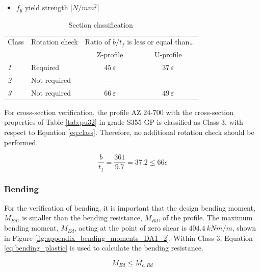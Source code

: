 \begin{itemize}
    \item $f_{y}$   yield strength [$N/mm^{2}$]
\end{itemize}

\begin{table}[H]
  \centering
  \small
  \setlength{\tabcolsep}{8pt}
  \renewcommand{\arraystretch}{1.15}
  \caption{Section classification}
  \label{tab:section_classification}
  \begin{tabular}{@{}l l c c@{}}
    \toprule
    \multicolumn{1}{l}{Class} &
    \multicolumn{1}{l}{Rotation check} &
    \multicolumn{2}{c}{Ratio of $b/t_f$ is less or equal than\ldots} \\
    \cmidrule(lr){3-4}
    & & Z-profile & U-profile \\
    \midrule
    \textit{1} & Required     & $45\,\varepsilon$ & $37\,\varepsilon$ \\
    \textit{2} & Not required & ---               & ---               \\
    \textit{3} & Not required & $66\,\varepsilon$ & $49\,\varepsilon$ \\
    \bottomrule
  \end{tabular}
\end{table}

For cross-section verification, the profile AZ 24-700 with the cross-section properties of Table \ref{tab:pu32} in grade S355 GP is classified as Class 3, with respect to Equation \ref{eq:class}. Therefore, no additional rotation check should be performed.

\begin{equation}
    \frac{b}{t_{f}} = \frac{361}{9.7} = 37.2 \leq 66 \epsilon 
    \label{eq:class}
\end{equation}

\subsubsection{Bending}

For the verification of bending, it is important that the design bending moment, $M_{Ed}$, is smaller than the bending resistance, $M_{Rd}$, of the profile. The maximum bending moment, $M_{Ed}$, acting at the point of zero shear is $404.4 \ kNm/m$, shown in Figure \ref{fig:appendix_bending_moments_DA1_2}. Within Class 3, Equation \ref{eq:bending_plastic} is used to calculate the bending resistance.

\begin{equation}
    M_{Ed} \leq M_{c,Rd}
\end{equation}

